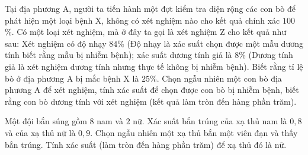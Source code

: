 \begin{bt}%
	Tại địa phương A, người ta tiến hành một đợt kiểm tra diện rộng các con bò để phát hiện một loại bệnh X, không có xét nghiệm nào cho kết quả chính xác $100$\%. Có một loại xét nghiệm, mà ở đây ta gọi là xét nghiệm Z cho kết quả như sau: Xét nghiệm có độ nhạy $84$\% (Độ nhạy là xác suất chọn được một mẫu dương tính biết rằng mẫu bị nhiễm bệnh); xác suất dương tính giả là $8$\% (Dương tính giả là xét nghiệm dương tính nhưng thực tế không bị nhiễm bệnh). Biết rằng tỉ  lệ bò ở địa phương A bị mắc bệnh X là $25$\%. Chọn ngẫu nhiên một con bò địa phương A để xét nghiệm, tính xác suất để chọn được con bò bị nhiễm bệnh, biết rằng con bò dương tính với xét nghiệm (kết quả làm tròn đến hàng phần trăm).
\end{bt}

\begin{bt}%
	Một đội bắn súng gồm $8$ nam và $2$ nữ. Xác suất bắn trúng của xạ thủ nam là $0{,}8$ và của xạ thủ nữ là  $0{,}9$. Chọn ngẫu nhiên một xạ thủ bắn một viên đạn và thấy bắn trúng. Tính xác suất (làm tròn đến hàng phần trăm) để xạ thủ đó là nữ.
\end{bt}

